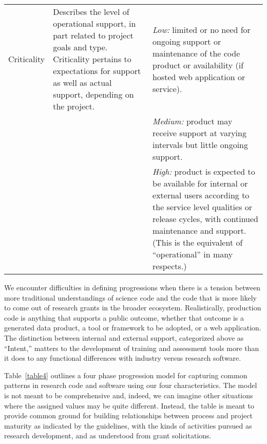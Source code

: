 \documentclass{article}
\begin{document}
\begin{table}[!hbp]
\begin{tabularx}{\textwidth}{lXX}
Criticality & Describes the level of operational support, in part related to project goals and type. Criticality pertains to expectations for support as well as actual support, depending on the project. & \textit{Low:} limited or no need for ongoing support or maintenance of the code product or availability (if hosted web application or service). \\
& & \textit{Medium:} product may receive support at varying intervals but little ongoing support. \\ 
& & \textit{High:} product is expected to be available for internal or external users according to the service level qualities or release cycles, with continued maintenance and support. (This is the equivalent of “operational” in many respects.) \\ \cline{1-3}
\end{tabularx}
\label{table3}
\end{table}

We encounter difficulties in defining progressions when there is a tension between more traditional understandings of science code and the code that is more likely to come out of research grants in the broader ecosystem. Realistically, production code is anything that supports a public outcome, whether that outcome is a generated data product, a tool or framework to be adopted, or a web application. The distinction between internal and external support, categorized above as “Intent,” matters to the development of training and assessment tools more than it does to any functional differences with industry versus research software. 
 
Table~\ref{table4} outlines a four phase progression model for capturing common patterns in research code and software using our four characteristics. The model is not meant to be comprehensive and, indeed, we can imagine other situations where the assigned values may be quite different. Instead, the table is meant to provide common ground for building relationships between process and project maturity as indicated by the guidelines, with the kinds of activities pursued as research development, and as understood from grant solicitations.
\end{document}
